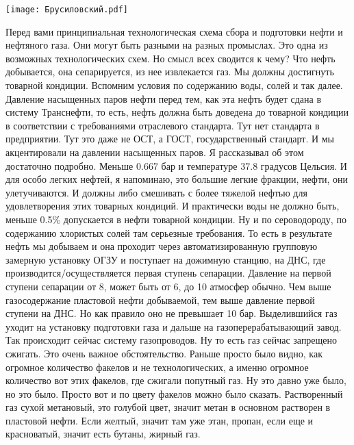 \documentclass[main.tex]{subfiles}
\begin{document}
\begin{center}
\texttt{[image: Брусиловский.pdf]}
\end{center}

Перед вами принципиальная технологическая схема сбора и подготовки нефти и нефтяного газа.
Они могут быть разными на разных промыслах.
Это одна из возможных технологических схем.
Но смысл всех сводится к чему?
Что нефть добывается, она сепарируется, из нее извлекается газ.
Мы должны достигнуть товарной кондиции.
Вспомним условия по содержанию воды, солей и так далее.
Давление насыщенных паров нефти перед тем, как эта нефть будет сдана в систему Транснефти, то есть, нефть должна быть доведена до товарной кондиции в соответствии с требованиями отраслевого стандарта.
Тут нет стандарта в предприятии.
Тут это даже не ОСТ, а ГОСТ, государственный стандарт.
И мы акцентировали на давлении насыщенных паров.
Я рассказывал об этом достаточно подробно.
Меньше 0.667 бар и температуре 37.8 градусов Цельсия.
И для особо легких нефтей, я напоминаю, это большие легкие фракции, нефти, они улетучиваются.
И должны либо смешивать с более тяжелой нефтью для удовлетворения этих товарных кондиций.
И практически воды не должно быть, меньше 0.5\% допускается в нефти товарной кондиции.
Ну и по сероводороду, по содержанию хлористых солей там серьезные требования.
То есть в результате нефть мы добываем и она проходит через автоматизированную групповую замерную установку ОГЗУ и поступает на дожимную станцию, на ДНС, где производится/осуществляется первая ступень сепарации.
Давление на первой ступени сепарации от 8, может быть от 6, до 10 атмосфер обычно.
Чем выше газосодержание пластовой нефти добываемой, тем выше давление первой ступени на ДНС.
Но как правило оно не превышает 10 бар.
Выделившийся газ уходит на установку подготовки газа и дальше на газоперерабатывающий завод.
Так происходит сейчас систему газопроводов.
Ну то есть газ сейчас запрещено сжигать.
Это очень важное обстоятельство.
Раньше просто было видно, как огромное количество факелов и не технологических, а именно огромное количество вот этих факелов, где сжигали попутный газ.
Ну это давно уже было, но это было.
Просто вот и по цвету факелов можно было сказать.
Растворенный газ сухой метановый, это голубой цвет, значит метан в основном растворен в пластовой нефти.
Если желтый, значит там уже этан, пропан, если еще и красноватый, значит есть бутаны, жирный газ.
\end{document}
